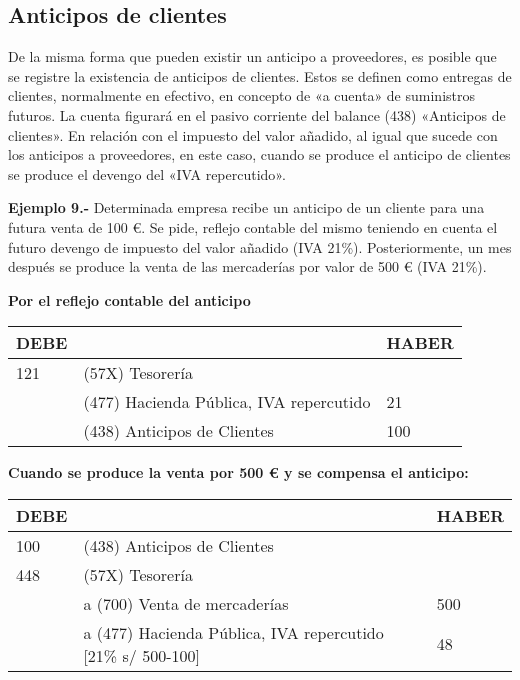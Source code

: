 \documentclass{article}
\begin{document}
\subsection{Anticipos de clientes}

De la misma forma que pueden existir un anticipo a proveedores, es posible que se registre la existencia de anticipos de clientes. Estos se definen como entregas de clientes, normalmente en efectivo, en concepto de «a cuenta» de suministros futuros. La cuenta figurará en el pasivo corriente del balance (438) «Anticipos de clientes». En relación con el impuesto del valor añadido, al igual que sucede con los anticipos a proveedores, en este caso, cuando se produce el anticipo de clientes se produce el devengo del «IVA repercutido».

\textbf{Ejemplo 9.-} Determinada empresa recibe un anticipo de un cliente para una futura venta de 100 €. Se pide, reflejo contable del mismo teniendo en cuenta el futuro devengo de impuesto del valor añadido (IVA 21\%). Posteriormente, un mes después se produce la venta de las mercaderías por valor de 500 € (IVA 21\%).

\begin{center}
\textbf{Por el reflejo contable del anticipo}
\begin{tabular}{|p{5cm}|p{5cm}|p{5cm}|}
\hline
\textbf{DEBE} & & \textbf{HABER} \\
\hline
121 & (57X) Tesorería & \\
\hline
 & (477) Hacienda Pública, IVA repercutido & 21\\
 \hline
 &  (438) Anticipos de Clientes & 100 \\
\hline
\end{tabular}
\end{center}

\begin{center}
\textbf{Cuando se produce la venta por 500 € y se compensa el anticipo:}
\begin{tabular}{|p{5cm}|p{5cm}|p{5cm}|}
\hline
\textbf{DEBE} & & \textbf{HABER} \\
\hline
100 & (438) Anticipos de Clientes & \\
\hline
448 & (57X) Tesorería & \\
\hline
 & a (700) Venta de mercaderías & 500\\
 \hline
 &  a (477) Hacienda Pública, IVA repercutido [21\% s/ 500-100] & 48\\
\hline
\end{tabular}
\end{center}
\end{document}
